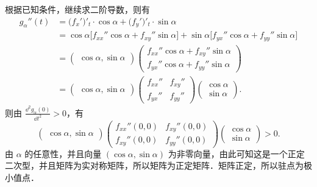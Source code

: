 \begin{solution}
  根据已知条件，继续求二阶导数，则有
  \begin{align*}
    g_\alpha''(t)&=\bigl(f_x'\bigr)'_t\cdot\cos\alpha
      +\bigl(f_y'\bigr)'_t\cdot\sin\alpha\\
    &=\cos\alpha\bigl[f_{xx}''\cos\alpha+f_{xy}''\sin\alpha\bigr]
      +\sin\alpha\bigl[f_{yx}''\cos\alpha+f_{yy}''\sin\alpha\bigr]\\
    &=\begin{pmatrix}\cos\alpha,\sin\alpha\end{pmatrix}
      \begin{pmatrix}
        f_{xx}''\cos\alpha+f_{xy}''\sin\alpha\\
        f_{yx}''\cos\alpha+f_{yy}''\sin\alpha
      \end{pmatrix}\\
    &=\begin{pmatrix}\cos\alpha,\sin\alpha\end{pmatrix}
      \begin{pmatrix}
        f_{xx}''&f_{xy}''\\
        f_{yx}''&f_{yy}''
      \end{pmatrix}
      \begin{pmatrix}\cos\alpha\\ \sin\alpha\end{pmatrix}.
  \end{align*}
  则由 $\displaystyle \frac{\dd^2 g_\alpha(0)}{\dd t^2}>0$，有
  \[
    \begin{pmatrix}\cos\alpha,\sin\alpha\end{pmatrix}
    \begin{pmatrix}
      f_{xx}''(0,0)&f_{xy}''(0,0)\\
      f_{xy}''(0,0)&f_{yy}''(0,0)
    \end{pmatrix}
    \begin{pmatrix}\cos\alpha\\ \sin\alpha\end{pmatrix}>0.
  \]
  由 $\alpha$ 的任意性，并且向量 $(\cos\alpha,\sin\alpha)$ 为非零向量，由此可知这是一个正定二次型，并且矩阵为实对称矩阵，所以矩阵为正定矩阵．矩阵正定，所以驻点为极小值点．
\end{solution}


